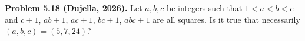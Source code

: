 \textbf{Problem 5.18 (Dujella, 2026).} Let $a,b,c$ be integers such that $1<a<b<c$ and $c+1$, $ab+1$, $ac+1$, $bc+1$, $abc+1$ are all squares. Is it true that necessarily $(a,b,c)=(5,7,24)$?
